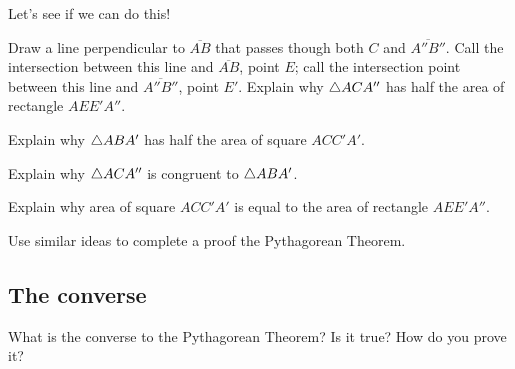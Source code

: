 \documentclass{ximera}
\begin{document}
Let's see if we can do this!


\begin{question}
Draw a line perpendicular to $\overline{AB}$ that passes though both $C$
and $\overline{A'' B''}$. Call the intersection between this line and
$\overline{AB}$, point $E$; call the intersection point between this line
and $\overline{A''B''}$, point $E'$. Explain why $\triangle ACA''$ has half the
area of rectangle $AEE'A''$.
\end{question}

\begin{question}
Explain why $\triangle ABA'$ has half the area of square $ACC'A'$.
\end{question}

\begin{question}
Explain why $\triangle ACA''$ is congruent to $\triangle ABA'$. 
\end{question}

\begin{question}
Explain why area of square $ACC'A'$ is equal to the area of rectangle
$AEE'A''$.
\end{question}


\begin{question}
Use similar ideas to complete a proof the Pythagorean Theorem.
\end{question}


\subsection*{The converse}

\begin{question} What is the converse to the Pythagorean Theorem? Is it true? How do you prove it?
\end{question}
\end{document}

